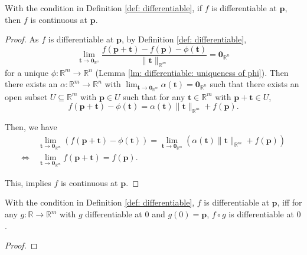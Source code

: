 \begin{lemma}
	With the condition in Definition \ref{def: differentiable}, if $f$ is differentiable at $\mathbf p$, then $f$ is continuous at $\mathbf p$.
	
	\begin{proof}
		As $f$ is differentiable at $\mathbf p$, by Definition \ref{def: differentiable},
		$$
		\lim_{\mathbf t \to \mathbf 0_{\mathbb R^n}} \frac{f(\mathbf p + \mathbf t) - f(\mathbf p) - \phi(\mathbf t)}{\| \mathbf t \|_{\mathbb R^m}} = \mathbf 0_{\mathbb R^n}
		$$
		for a unique $\phi: \mathbb R^m \to \mathbb R^n$ (Lemma \ref{lm: differentiable: uniqueness of phi}). Then there exists an $\alpha: \mathbb R^m \to \mathbb R^n$ with $\displaystyle \lim_{\mathbf t \to \mathbf 0_{\mathbb R^m}}\alpha(\mathbf t) = \mathbf 0_{\mathbb R^n}$ such that there exists an open subset $U \subseteq \mathbb R^m$ with $\mathbf p \in U$ such that for any $\mathbf t \in \mathbb R^m$ with $\mathbf p + \mathbf t \in U$,
		$$
		f(\mathbf p + \mathbf t) - \phi(\mathbf t) = \alpha(\mathbf t)\| \mathbf t \|_{\mathbb R^m} + f(\mathbf p).
		$$
		
		Then, we have
		$$
		\begin{aligned}
			& \ \lim_{\mathbf t \to \mathbf 0_{\mathbb R^m}} (f(\mathbf p + \mathbf t) - \phi(\mathbf t)) = \lim_{\mathbf t \to \mathbf 0_{\mathbb R^m}}( \alpha(\mathbf t)\| \mathbf t \|_{\mathbb R^m} + f(\mathbf p)) \\
			\iff & \ \lim_{\mathbf t \to \mathbf 0_{\mathbb R^m}} f(\mathbf p + \mathbf t) = f(\mathbf p).
		\end{aligned}
		$$
		
		This, implies $f$ is continuous at $\mathbf p$.
	\end{proof}
\end{lemma}


\begin{lemma}
	With the condition in Definition \ref{def: differentiable}, $f$ is differentiable at $\mathbf p$, iff for any $g: \mathbb R \to \mathbb R^m$ with $g$ differentiable at $0$ and $g(0) = \mathbf p$, $f \circ g$ is differentiable at $0$.
	
	\begin{proof}

	\end{proof}
\end{lemma}





